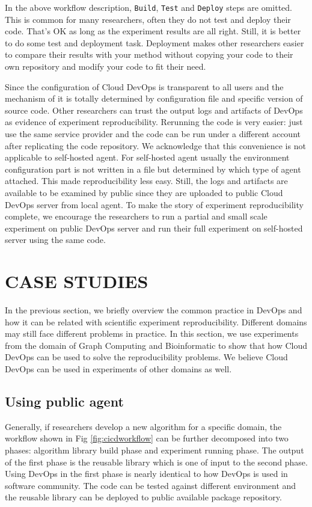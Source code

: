 \documentclass{IEEEcsmag}
\begin{document}
In the above workflow description, \texttt{Build}, \texttt{Test} and \texttt{Deploy} steps are omitted. This is common for many researchers, often they do not test and deploy their code. That's OK as long as the experiment results are all right. Still, it is better to do some test and deployment task. Deployment makes other researchers easier to compare their results with your method without copying your code to their own repository and modify your code to fit their need.

Since the configuration of Cloud DevOps is transparent to all users and the mechanism of it is totally determined by configuration file and specific version of source code. Other researchers can trust the output logs and artifacts of DevOps as evidence of experiment reproducibility. Rerunning the code is very easier: just use the same service provider and the code can be run under a different account after replicating the code repository. We acknowledge that this convenience is not applicable to self-hosted agent. For self-hosted agent usually the environment configuration part is not written in a file but determined by which type of agent attached. This made reproducibility less easy. Still, the logs and artifacts are available to be examined by public since they are uploaded to public Cloud DevOps server from local agent. To make the story of experiment reproducibility complete,
we encourage the researchers to run a partial and small scale experiment on public DevOps server and run their full experiment on self-hosted server using the same code. 

\section{CASE STUDIES}
In the previous section, we briefly overview the common practice in DevOps and how it can be related with scientific experiment reproducibility. Different domains may still face different problems in practice. In this section, we use experiments from the domain of Graph Computing and Bioinformatic to show that how Cloud DevOps can be used to solve the reproducibility problems. We believe Cloud DevOps can be used in experiments of other domains as well. 

\subsection{Using public agent}
Generally, if researchers develop a new algorithm for a specific domain, the workflow shown in Fig \ref{fig:cicdworkflow} can be further decomposed into two phases:
algorithm library build phase and experiment running phase. The output of the first phase is the reusable library which is one of input to the second phase. Using DevOps in the first phase is nearly identical to how DevOps is used in software community.  The code can be tested against different environment and 
the reusable library can be deployed to public available package repository.
 
\end{document}
